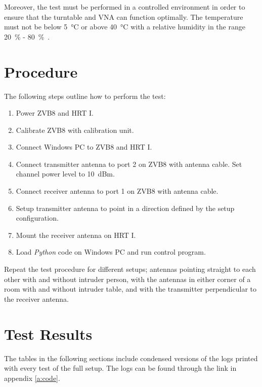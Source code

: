 Moreover, the test must be performed in a controlled environment in order to ensure that the turntable and VNA can function optimally. The temperature must not be below \SI{5}{\celsius} or above \SI{40}{\celsius} with a relative humidity in the range \SI{20}{\percent} - \SI{80}{\percent}~\cite{hrt_i_data_sheet}\cite{vna_data_sheet_spec}.

\section{Procedure}
The following steps outline how to perform the test:

\begin{enumerate}
    \item Power ZVB8 and HRT I. 
    \item Calibrate ZVB8 with calibration unit.
    \item Connect Windows PC to ZVB8 and HRT I.
    \item Connect transmitter antenna to port 2 on ZVB8 with antenna cable. Set channel power level to \SI{10}{dBm}.
    \item Connect receiver antenna to port 1 on ZVB8 with antenna cable.
    \item Setup transmitter antenna to point in a direction defined by the setup configuration. 
    \item Mount the receiver antenna on HRT I.
    \item Load \textit{Python} code on Windows PC and run control program.
\end{enumerate}

Repeat the test procedure for different setups; antennas pointing straight to each other with and without intruder person, with the antennas in either corner of a room with and without intruder table, and with the transmitter perpendicular to the receiver antenna. 

\section{Test Results}
The tables in the following sections include condensed versions of the logs printed with every test of the full setup. The logs can be found through the link in appendix \ref{a:code}. 

